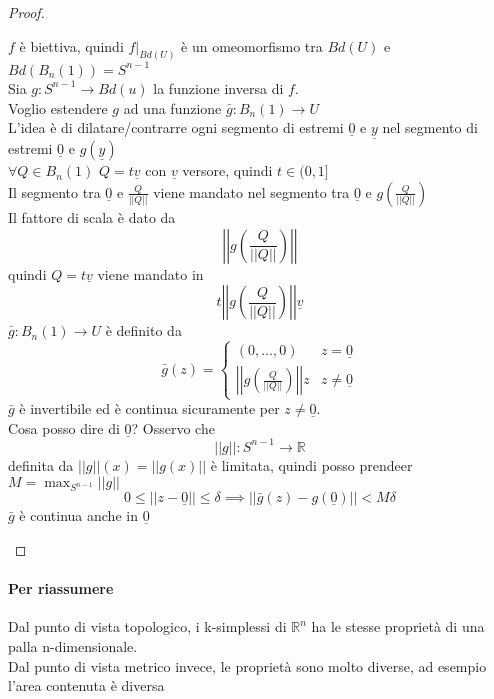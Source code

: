 \documentclass[a4paper]{report}
\newcommand{\R}{\ensuremath{\mathbb{R}}}
\newcommand{\ra}{\ensuremath{\rightarrow}}
\begin{document}
\begin{proof}
\begin{enumerate}
\[              \]
              $f$ è biettiva, quindi $\left.f\right|_{Bd(U)}$ è un omeomorfismo tra $Bd(U)$ e $Bd(B_n(1))=S^{n-1}$\\
              Sia $g:S^{n-1}\ra Bd(u)$ la funzione inversa di $f$.\\
              Voglio estendere $g$ ad una funzione $\bar{g}:B_n(1)\ra U$\\
              L'idea è di dilatare/contrarre ogni segmento di estremi $\underline{0}$ e $\underline{y}$ nel segmento di estremi $\underline{0}$ e $g(\underline{y})$\\
              $\forall Q\in B_n(1)$ $Q=t\underline{v}$ con $\underline{v}$ versore, quindi $t\in(0,1]$\\
              Il segmento tra $\underline{0}$ e $\frac{Q}{||Q||}$ viene mandato nel segmento tra $\underline{0}$ e $g\left(\frac{Q}{||Q||}\right)$\\
              Il fattore di scala è dato da
              \[
                  \left|\left|g\left(\frac{Q}{||Q||}\right)\right|\right|
              \]
              quindi $Q=t\underline{v}$ viene mandato in
              \[t\left|\left|g\left(\frac{Q}{||Q||}\right)\right|\right|\underline{v}\]
              $\bar{g}:B_n(1)\ra U$ è definito da
              \[
                  \bar{g}(z)=\left\{
                  \begin{array}{ll}
                      (0,\dots,0)                                              & z=\underline{0}    \\
                      \left|\left|g\left(\frac{Q}{||Q||}\right)\right|\right|z & z\neq\underline{0}
                  \end{array}
                  \right.
              \]
              $\bar{g}$ è invertibile ed è continua sicuramente per $z\neq\underline{0}$.\\
              Cosa posso dire di $\underline{0}$? Osservo che
              \[
                  ||g||:S^{n-1}\ra\R
              \]
              definita da $||g||(x)=||g(x)||$ è limitata, quindi posso prendeer $M=\max_{S^{n-1}}||g||$
              \[
                  0\leq||z-\underline{0}||\leq\delta\implies||\bar{g}(z)-g(\underline{0})||<M\delta
              \]
              $\bar{g}$ è continua anche in $\underline{0}$
    \end{enumerate}
\end{proof}
\paragraph{Per riassumere} Dal punto di vista topologico, i k-simplessi di $\R^n$ ha le stesse proprietà di una palla n-dimensionale.\\
Dal punto di vista metrico invece, le proprietà sono molto diverse, ad esempio l'area contenuta è diversa
\end{document}
